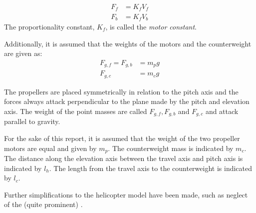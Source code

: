 \begin{subequations}\label{eq:P1_forces_propellers}
    \begin{align}
        F_f&=K_f V_f     \label{eq:P1_forces_propellers_f} \\
        F_b&=K_f V_b     \label{eq:P1_forces_propellers_b}
    \end{align}
\end{subequations}
The proportionality constant, $K_f$, is called the \textit{motor constant}. 

Additionally, it is assumed that the weights of the motors and the counterweight are given as:
\begin{subequations}\label{eq:P1_weights}
    \begin{align}
        F_{g,f}=F_{g,b}&= m_pg   \label{eq:P1_weight_m_p} \\
                F_{g,c}&=m_cg    \label{eq:P1_weight_m_c}
    \end{align}
\end{subequations}

The propellers are placed symmetrically in relation to the pitch axis and the forces always attack perpendicular to the plane made by the pitch and elevation axis. The weight of the point masses are called $F_{g,f}, F_{g,b}$ and $F_{g,c}$ and attack parallel to gravity.

For the sake of this report, it is assumed that the weight of the two propeller motors are equal and given by $m_p$. The counterweight mass is indicated by $m_c$. The distance along the elevation axis between the travel axis and pitch axis is indicated by $l_h$. The length from the travel axis to the counterweight is indicated by $l_c$. 

Further simplifications to the helicopter model have been made, such as neglect of the (quite prominent) .\cite{CheesemanGregory} 

